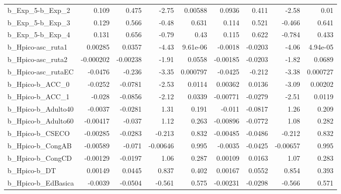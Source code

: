 \begin{tabular}{lrrrrrrrr}
b\_Exp\_5-b\_Exp\_2            &       0.109 &        0.475 &    -2.75 &  0.00588 &     0.0936 &       0.411 &        -2.58 &          0.01 \\
b\_Exp\_5-b\_Exp\_3            &       0.129 &        0.566 &    -0.48 &    0.631 &      0.114 &       0.521 &       -0.466 &         0.641 \\
b\_Exp\_5-b\_Exp\_4            &       0.131 &        0.656 &    -0.79 &     0.43 &      0.115 &       0.622 &       -0.784 &         0.433 \\
b\_Hpico-asc\_ruta1          &     0.00285 &       0.0357 &    -4.43 & 9.61e-06 &    -0.0018 &     -0.0203 &        -4.06 &      4.94e-05 \\
b\_Hpico-asc\_ruta2          &   -0.000202 &     -0.00238 &    -1.91 &   0.0558 &   -0.00185 &     -0.0203 &        -1.82 &        0.0689 \\
b\_Hpico-asc\_rutaEC         &     -0.0476 &       -0.236 &    -3.35 & 0.000797 &    -0.0425 &      -0.212 &        -3.38 &      0.000727 \\
b\_Hpico-b\_ACC\_0            &     -0.0252 &      -0.0781 &    -2.53 &   0.0114 &    0.00362 &      0.0136 &        -3.09 &       0.00202 \\
b\_Hpico-b\_ACC\_1            &      -0.028 &      -0.0856 &    -2.12 &   0.0339 &   -0.00771 &     -0.0279 &        -2.51 &        0.0119 \\
b\_Hpico-b\_Adulto40         &     -0.0037 &      -0.0281 &     1.31 &    0.191 &     -0.011 &     -0.0817 &         1.26 &         0.209 \\
b\_Hpico-b\_Adulto60         &    -0.00417 &       -0.037 &     1.12 &    0.263 &   -0.00896 &     -0.0772 &         1.08 &         0.282 \\
b\_Hpico-b\_CSECO            &    -0.00285 &      -0.0283 &   -0.213 &    0.832 &   -0.00485 &     -0.0486 &       -0.212 &         0.832 \\
b\_Hpico-b\_CongAB           &    -0.00589 &       -0.071 & -0.00646 &    0.995 &    -0.0035 &     -0.0425 &     -0.00657 &         0.995 \\
b\_Hpico-b\_CongCD           &    -0.00129 &      -0.0197 &     1.06 &    0.287 &    0.00109 &      0.0163 &         1.07 &         0.283 \\
b\_Hpico-b\_DT               &     0.00149 &       0.0445 &    0.837 &    0.402 &    0.00167 &      0.0552 &        0.854 &         0.393 \\
b\_Hpico-b\_EdBasica         &     -0.0039 &      -0.0504 &   -0.561 &    0.575 &   -0.00231 &     -0.0298 &       -0.566 &         0.571 \\

\end{tabular}
